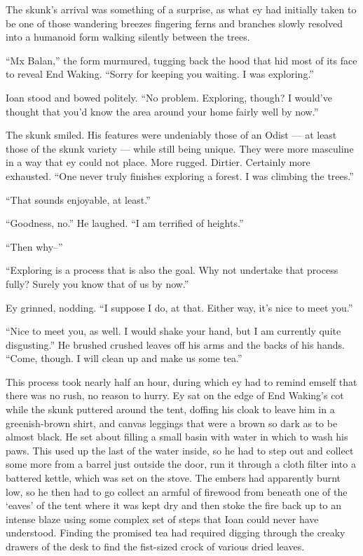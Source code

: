 The skunk's arrival was something of a surprise, as what ey had initially taken to be one of those wandering breezes fingering ferns and branches slowly resolved into a humanoid form walking silently between the trees.

``Mx Balan,'' the form murmured, tugging back the hood that hid most of its face to reveal End Waking. ``Sorry for keeping you waiting. I was exploring.''

Ioan stood and bowed politely. ``No problem. Exploring, though? I would've thought that you'd know the area around your home fairly well by now.''

The skunk smiled. His features were undeniably those of an Odist — at least those of the skunk variety — while still being unique. They were more masculine in a way that ey could not place. More rugged. Dirtier. Certainly more exhausted. ``One never truly finishes exploring a forest. I was climbing the trees.''

``That sounds enjoyable, at least.''

``Goodness, no.'' He laughed. ``I am terrified of heights.''

``Then why--''

``Exploring is a process that is also the goal. Why not undertake that process fully? Surely you know that of us by now.''

Ey grinned, nodding. ``I suppose I do, at that. Either way, it's nice to meet you.''

``Nice to meet you, as well. I would shake your hand, but I am currently quite disgusting.'' He brushed crushed leaves off his arms and the backs of his hands. ``Come, though. I will clean up and make us some tea.''

This process took nearly half an hour, during which ey had to remind emself that there was no rush, no reason to hurry. Ey sat on the edge of End Waking's cot while the skunk puttered around the tent, doffing his cloak to leave him in a greenish-brown shirt, and canvas leggings that were a brown so dark as to be almost black. He set about filling a small basin with water in which to wash his paws. This used up the last of the water inside, so he had to step out and collect some more from a barrel just outside the door, run it through a cloth filter into a battered kettle, which was set on the stove. The embers had apparently burnt low, so he then had to go collect an armful of firewood from beneath one of the `eaves' of the tent where it was kept dry and then stoke the fire back up to an intense blaze using some complex set of steps that Ioan could never have understood. Finding the promised tea had required digging through the creaky drawers of the desk to find the fist-sized crock of various dried leaves.

